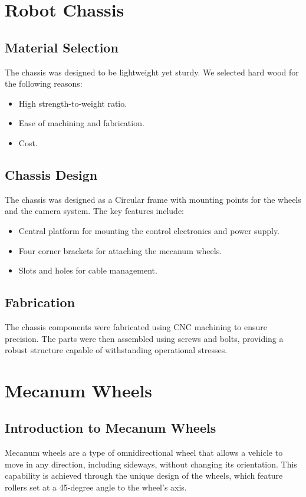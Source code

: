 \newpage

\section{Robot Chassis}
\subsection{Material Selection}
The chassis was designed to be lightweight yet sturdy. We selected hard wood for the following
reasons:
\begin{itemize}
	\item High strength-to-weight ratio.
	\item Ease of machining and fabrication.
	\item Cost.
\end{itemize}


\subsection{Chassis Design}
The chassis was designed as a Circular frame with mounting points for the wheels and the camera
system. The key features include:
\begin{itemize}
	\item Central platform for mounting the control electronics and power supply.
	\item Four corner brackets for attaching the mecanum wheels.
	\item Slots and holes for cable management.
\end{itemize}


\subsection{Fabrication}
The chassis components were fabricated using CNC machining to ensure precision. The parts were
then assembled using screws and bolts, providing a robust structure capable of withstanding
operational stresses.

\section{Mecanum Wheels}

\subsection{Introduction to Mecanum Wheels}
Mecanum wheels are a type of omnidirectional wheel that allows a vehicle to move in any direction,
including sideways, without changing its orientation. This capability is achieved through the unique
design of the wheels, which feature rollers set at a 45-degree angle to the wheel’s axis.

